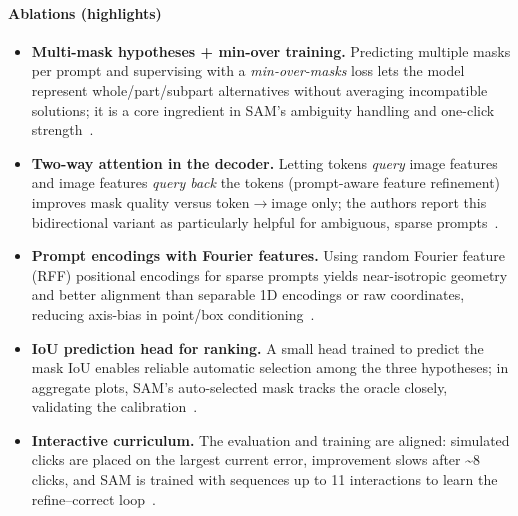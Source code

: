 \begin{enrichment}
\begin{enrichment}
		\paragraph{Ablations (highlights)}
		\begin{itemize}
			\item \textbf{Multi-mask hypotheses + min-over training.} Predicting multiple masks per prompt and supervising with a \emph{min-over-masks} loss lets the model represent whole/part/subpart alternatives without averaging incompatible solutions; it is a core ingredient in SAM’s ambiguity handling and one-click strength~\cite{kirillov2023_sam}.
			\item \textbf{Two-way attention in the decoder.} Letting tokens \emph{query} image features and image features \emph{query back} the tokens (prompt-aware feature refinement) improves mask quality versus token$\rightarrow$image only; the authors report this bidirectional variant as particularly helpful for ambiguous, sparse prompts~\cite{kirillov2023_sam}.
			\item \textbf{Prompt encodings with Fourier features.} Using random Fourier feature (RFF) positional encodings for sparse prompts yields near-isotropic geometry and better alignment than separable 1D encodings or raw coordinates, reducing axis-bias in point/box conditioning~\cite{kirillov2023_sam,tancik2020_fourierfeatures}.  
			\item \textbf{IoU prediction head for ranking.} A small head trained to predict the mask IoU enables reliable automatic selection among the three hypotheses; in aggregate plots, SAM’s auto-selected mask tracks the oracle closely, validating the calibration~\cite{kirillov2023_sam}.
			\item \textbf{Interactive curriculum.} The evaluation and training are aligned: simulated clicks are placed on the largest current error, improvement slows after \textasciitilde8 clicks, and SAM is trained with sequences up to 11 interactions to learn the refine–correct loop~\cite{kirillov2023_sam}. 
		\end{itemize}
		

\end{enrichment}
\end{enrichment}
